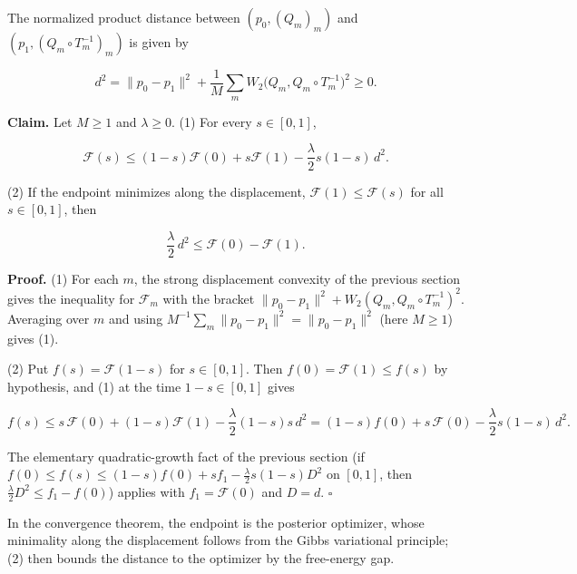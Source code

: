 \documentclass[11pt,a4paper]{report}
\begin{document}
The normalized product distance between \((p_0,(Q_m)_m)\) and \((p_1,(Q_m\circ T_m^{-1})_m)\) is given by


\[d^2=\|p_0-p_1\|^2+\frac1M\sum_mW_2\bigl(Q_m,Q_m\circ T_m^{-1}\bigr)^2\ge0.\]


\textbf{Claim.} Let \(M\ge1\) and \(\lambda\ge0\). (1) For every \(s\in[0,1]\),


\[\mathcal F(s)\le(1-s)\mathcal F(0)+s\mathcal F(1)-\frac\lambda2s(1-s)\,d^2.\]


(2) If the endpoint minimizes along the displacement, \(\mathcal F(1)\le\mathcal F(s)\) for all \(s\in[0,1]\), then


\[\frac\lambda2\,d^2\le\mathcal F(0)-\mathcal F(1).\]


\textbf{Proof.} (1) For each \(m\), the strong displacement convexity of the previous section gives the inequality for \(\mathcal F_m\) with the bracket \(\|p_0-p_1\|^2+W_2(Q_m,Q_m\circ T_m^{-1})^2\). Averaging over \(m\) and using \(M^{-1}\sum_m\|p_0-p_1\|^2=\|p_0-p_1\|^2\) (here \(M\ge1\)) gives (1).




(2) Put \(f(s)=\mathcal F(1-s)\) for \(s\in[0,1]\). Then \(f(0)=\mathcal F(1)\le f(s)\) by hypothesis, and (1) at the time \(1-s\in[0,1]\) gives


\[f(s)\le s\,\mathcal F(0)+(1-s)\mathcal F(1)-\frac\lambda2(1-s)s\,d^2=(1-s)f(0)+s\,\mathcal F(0)-\frac\lambda2s(1-s)\,d^2.\]


The elementary quadratic-growth fact of the previous section (if \(f(0)\le f(s)\le(1-s)f(0)+sf_1-\frac\lambda2s(1-s)D^2\) on \([0,1]\), then \(\frac\lambda2D^2\le f_1-f(0)\)) applies with \(f_1=\mathcal F(0)\) and \(D=d\). \(\square\)




In the convergence theorem, the endpoint is the posterior optimizer, whose minimality along the displacement follows from the Gibbs variational principle; (2) then bounds the distance to the optimizer by the free-energy gap.
\end{document}
